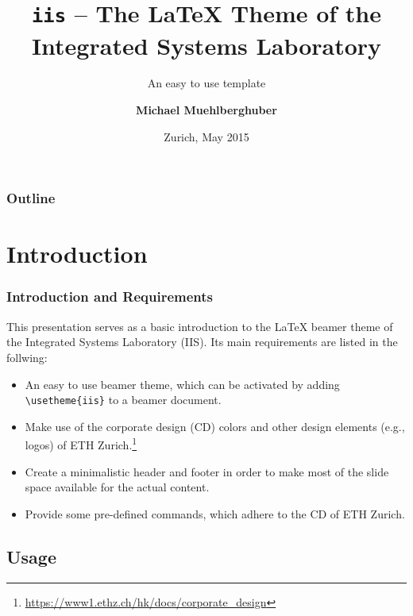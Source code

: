 \documentclass{beamer}
\title{\textbf{\texttt{iis}} -- The \LaTeX{} \latexcls{beamer} Theme of the Integrated Systems Laboratory}
\subtitle{An easy to use template}
\date{Zurich, May 2015}
\author[%
  Doe %
]{%
  \textbf{Michael Muehlberghuber}%
}
\institute[%
  Integrated Systems Laboratory%
]{Integrated Systems Laboratory}
\newcommand\latexcls[1]{\textsf{#1}}
\begin{document}
\begin{frame}
\titlepage
\end{frame}

\begin{frame}
\frametitle{Outline}
\tableofcontents
\end{frame}

\section{Introduction}

\begin{frame}[%
  fragile %
]
\frametitle{Introduction and Requirements}
%
This presentation serves as a basic introduction to the \LaTeX{}
\latexcls{beamer} theme of the Integrated Systems Laboratory
(IIS). Its main requirements are listed in the follwing: \vfill
%
  \begin{itemize}
  \item An easy to use \latexcls{beamer} theme, which can be activated
    by adding \lstinline[style=latexcodestyle]!\usetheme{iis}! to a
    \latexcls{beamer} document. \vfill
  \item Make use of the corporate design (CD) colors and other design
    elements (e.g., logos) of ETH
    Zurich.\footnote{\url{https://www1.ethz.ch/hk/docs/corporate_design}}
    \vfill
  \item Create a minimalistic header and footer in order to make most of
    the slide space available for the actual content. \vfill
  \item Provide some pre-defined commands, which adhere to the CD of
    ETH Zurich.
  \end{itemize}
\end{frame}

\subsection{Usage}
\end{document}

